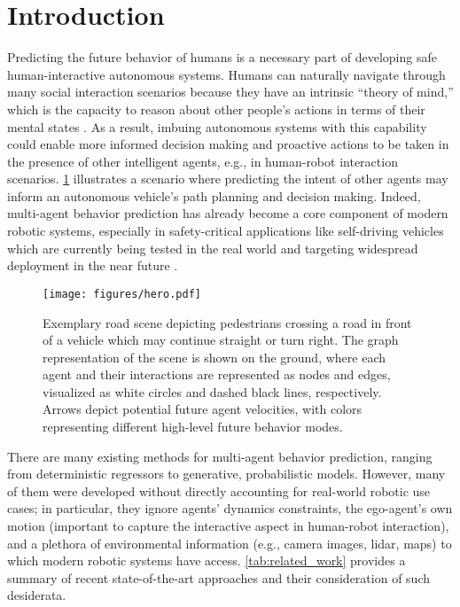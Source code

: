 \documentclass[runningheads]{llncs}
\begin{document}
\section{Introduction}

Predicting the future behavior of humans is a necessary part of developing safe human-interactive autonomous systems. Humans can naturally navigate through many social interaction scenarios because they have an intrinsic ``theory of mind,'' which is the capacity to reason about other people's actions in terms of their mental states \cite{GweonSaxe2013}.
As a result, imbuing autonomous systems with this capability
could enable more informed decision making and proactive actions to be taken in the presence of other intelligent agents, e.g., in human-robot interaction scenarios. \cref{fig:hero} illustrates a scenario where predicting the intent of other agents may inform an autonomous vehicle's path planning and decision making. Indeed, multi-agent behavior prediction has already become a core component of modern robotic systems, especially in safety-critical applications like self-driving vehicles which are currently being tested in the real world and targeting widespread deployment in the near future \cite{WaymoSafety2018}.

\begin{figure}[t]
    \centering
    \texttt{[image: figures/hero.pdf]}
    \caption{Exemplary road scene depicting pedestrians crossing a road in front of a vehicle which may continue straight or turn right. The graph representation of the scene is shown on the ground, where each agent and their interactions are represented as nodes and edges, visualized as white circles and dashed black lines, respectively. Arrows depict potential future agent velocities, with colors representing different high-level future behavior modes.}
    \label{fig:hero}
\end{figure}

There are many existing methods for multi-agent behavior prediction, ranging from deterministic regressors to generative, probabilistic models. However, many of them were developed without directly accounting for real-world robotic use cases; in particular, they ignore agents' dynamics constraints, the ego-agent's own motion (important to capture the interactive aspect in human-robot interaction), and 
a plethora of environmental information (e.g., camera images, lidar, maps) to which modern robotic systems have access. \cref{tab:related_work} provides a summary of recent state-of-the-art approaches and their consideration of such desiderata.
\end{document}
